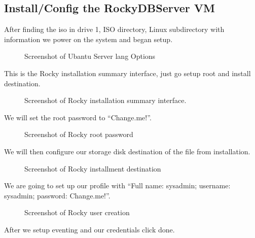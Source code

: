 \documentclass{article}
\begin{document}
	\subsection{Install/Config the RockyDBServer VM}
	\label{subsec:Install/Config the RockyDBServer VMID}

	After finding the iso in drive 1, ISO directory, Linux subdirectory with information we power on the system and began setup.

		\FloatBarrier
		\begin{figure}[h!]
			\centering
			\caption{Screenshot of Ubantu Server lang Options}
		\end{figure}
		\FloatBarrier


	This is the Rocky installation summary interface, just go setup root and install destination.

		\FloatBarrier
		\begin{figure}[h!]
			\centering
			\caption{Screenshot of Rocky installation summary interface.}
		\end{figure}
		\FloatBarrier


	We will set the root password to “Change.me!”.

		\FloatBarrier
		\begin{figure}[h!]
			\centering
			\caption{Screenshot of Rocky root password}
		\end{figure}
		\FloatBarrier


	We will then configure our storage disk destination of the file from installation.

		\FloatBarrier
		\begin{figure}[h!]
			\centering
			\caption{Screenshot of Rocky installment destination}
		\end{figure}
		\FloatBarrier


	We are going to set up our profile with “Full name: sysadmin; username: sysadmin; password: Change.me!”.

		\FloatBarrier
		\begin{figure}[h!]
			\centering
			\caption{Screenshot of Rocky user creation}
		\end{figure}
		\FloatBarrier


	After we setup eventing and our credentials click done.
\end{document}

